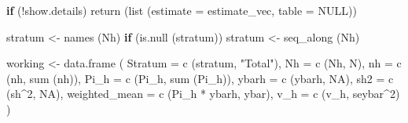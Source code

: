 \documentclass[
  letterpaper,
  DIV=11,
  numbers=noendperiod]{scrreprt}
\newenvironment{Shaded}{\begin{snugshade}}{\end{snugshade}}
\newcommand{\AttributeTok}[1]{\textcolor[rgb]{0.40,0.45,0.13}{#1}}
\newcommand{\ConstantTok}[1]{\textcolor[rgb]{0.56,0.35,0.01}{#1}}
\newcommand{\ControlFlowTok}[1]{\textcolor[rgb]{0.00,0.23,0.31}{\textbf{#1}}}
\newcommand{\DecValTok}[1]{\textcolor[rgb]{0.68,0.00,0.00}{#1}}
\newcommand{\FunctionTok}[1]{\textcolor[rgb]{0.28,0.35,0.67}{#1}}
\newcommand{\NormalTok}[1]{\textcolor[rgb]{0.00,0.23,0.31}{#1}}
\newcommand{\OtherTok}[1]{\textcolor[rgb]{0.00,0.23,0.31}{#1}}
\newcommand{\SpecialCharTok}[1]{\textcolor[rgb]{0.37,0.37,0.37}{#1}}
\newcommand{\StringTok}[1]{\textcolor[rgb]{0.13,0.47,0.30}{#1}}
\renewcommand{\[}{\begin{equation}}
\renewcommand{\]}{\end{equation}}
\begin{document}
\begin{Shaded}
\begin{Highlighting}[]
    \ControlFlowTok{if}\NormalTok{ (}\SpecialCharTok{!}\NormalTok{show.details)}
        \FunctionTok{return}\NormalTok{ (}\FunctionTok{list}\NormalTok{ (}\AttributeTok{estimate =}\NormalTok{ estimate\_vec, }\AttributeTok{table =} \ConstantTok{NULL}\NormalTok{))}

\NormalTok{    stratum }\OtherTok{\textless{}{-}} \FunctionTok{names}\NormalTok{ (Nh)}
    \ControlFlowTok{if}\NormalTok{ (}\FunctionTok{is.null}\NormalTok{ (stratum)) stratum }\OtherTok{\textless{}{-}} \FunctionTok{seq\_along}\NormalTok{ (Nh)}

\NormalTok{    working }\OtherTok{\textless{}{-}} \FunctionTok{data.frame}\NormalTok{ (}
        \AttributeTok{Stratum       =} \FunctionTok{c}\NormalTok{ (stratum, }\StringTok{"Total"}\NormalTok{),}
        \AttributeTok{Nh            =} \FunctionTok{c}\NormalTok{ (Nh, N),}
        \AttributeTok{nh            =} \FunctionTok{c}\NormalTok{ (nh, }\FunctionTok{sum}\NormalTok{ (nh)),}
        \AttributeTok{Pi\_h          =} \FunctionTok{c}\NormalTok{ (Pi\_h, }\FunctionTok{sum}\NormalTok{ (Pi\_h)),}
        \AttributeTok{ybarh         =} \FunctionTok{c}\NormalTok{ (ybarh, }\ConstantTok{NA}\NormalTok{),}
        \AttributeTok{sh2           =} \FunctionTok{c}\NormalTok{ (sh}\SpecialCharTok{\^{}}\DecValTok{2}\NormalTok{, }\ConstantTok{NA}\NormalTok{),}
        \AttributeTok{weighted\_mean =} \FunctionTok{c}\NormalTok{ (Pi\_h }\SpecialCharTok{*}\NormalTok{ ybarh, ybar),}
        \AttributeTok{v\_h           =} \FunctionTok{c}\NormalTok{ (v\_h, seybar}\SpecialCharTok{\^{}}\DecValTok{2}\NormalTok{)}
\NormalTok{    )}


\end{Highlighting}
\end{Shaded}
\end{document}
